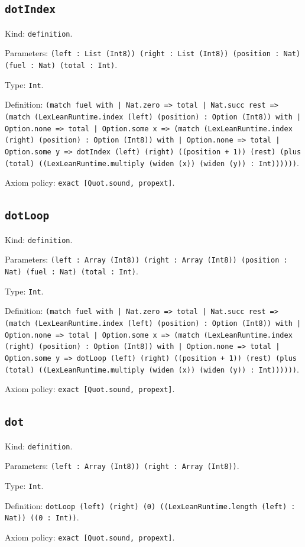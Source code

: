 \documentclass[11pt]{article}
\begin{document}
\subsection*{\texttt{dotIndex}}
\noindent Kind: \texttt{definition}.\par
\noindent Parameters: \texttt{(left : List (Int8)) (right : List (Int8)) (position : Nat) (fuel : Nat) (total : Int)}.\par
\noindent Type: \texttt{Int}.\par
\noindent Definition: \texttt{(match fuel with | Nat.zero => total | Nat.succ rest => (match (LexLeanRuntime.index (left) (position) : Option (Int8)) with | Option.none => total | Option.some x => (match (LexLeanRuntime.index (right) (position) : Option (Int8)) with | Option.none => total | Option.some y => dotIndex (left) (right) ((position + 1)) (rest) (plus (total) ((LexLeanRuntime.multiply (widen (x)) (widen (y)) : Int))))))}.\par
\noindent Axiom policy: \texttt{exact [Quot.sound, propext]}.\par
\subsection*{\texttt{dotLoop}}
\noindent Kind: \texttt{definition}.\par
\noindent Parameters: \texttt{(left : Array (Int8)) (right : Array (Int8)) (position : Nat) (fuel : Nat) (total : Int)}.\par
\noindent Type: \texttt{Int}.\par
\noindent Definition: \texttt{(match fuel with | Nat.zero => total | Nat.succ rest => (match (LexLeanRuntime.index (left) (position) : Option (Int8)) with | Option.none => total | Option.some x => (match (LexLeanRuntime.index (right) (position) : Option (Int8)) with | Option.none => total | Option.some y => dotLoop (left) (right) ((position + 1)) (rest) (plus (total) ((LexLeanRuntime.multiply (widen (x)) (widen (y)) : Int))))))}.\par
\noindent Axiom policy: \texttt{exact [Quot.sound, propext]}.\par
\subsection*{\texttt{dot}}
\noindent Kind: \texttt{definition}.\par
\noindent Parameters: \texttt{(left : Array (Int8)) (right : Array (Int8))}.\par
\noindent Type: \texttt{Int}.\par
\noindent Definition: \texttt{dotLoop (left) (right) (0) ((LexLeanRuntime.length (left) : Nat)) ((0 : Int))}.\par
\noindent Axiom policy: \texttt{exact [Quot.sound, propext]}.\par
\end{document}
